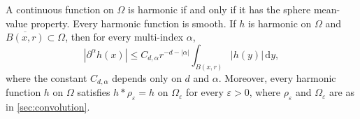 \begin{theorem}\label{thm:harmonic-mean-characterization}
A continuous function on $\Omega$ is harmonic if and only if it has the sphere mean-value property. Every harmonic function is smooth. If $h$ is harmonic on $\Omega$ and $\overline{B(x,r)}\subset\Omega$, then for every multi-index $\alpha$,
\begin{equation}\label{eq:harmonic-interior-derivatives}
 |\partial^\alpha h(x)|\leq C_{d,\alpha}r^{-d-|\alpha|}\int_{B(x,r)}|h(y)|\,\mathrm d y,
\end{equation}
where the constant $C_{d,\alpha}$ depends only on $d$ and $\alpha$. Moreover, every harmonic function $h$ on $\Omega$ satisfies $h*\rho_\varepsilon=h$ on $\Omega_\varepsilon$ for every $\varepsilon>0$, where $\rho_\varepsilon$ and $\Omega_\varepsilon$ are as in \cref{sec:convolution}.
\end{theorem}
